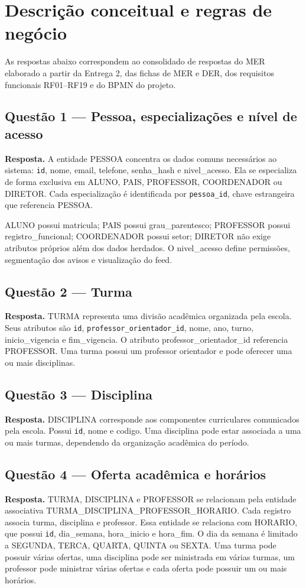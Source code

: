\section{Descrição conceitual e regras de negócio}
\begin{notebox}
As respostas abaixo correspondem ao consolidado de respostas do MER elaborado a partir da
Entrega 2, das fichas de MER e DER, dos requisitos funcionais RF01--RF19 e do BPMN do projeto.
\end{notebox}

\subsection{Questão 1 — Pessoa, especializações e nível de acesso}
\textbf{Resposta.} A entidade PESSOA concentra os dados comuns necessários ao sistema:
\texttt{id}, nome, email, telefone, senha\_hash e nivel\_acesso. Ela se especializa de forma exclusiva
em ALUNO, PAIS, PROFESSOR, COORDENADOR ou DIRETOR. Cada especialização é identificada por
\texttt{pessoa\_id}, chave estrangeira que referencia PESSOA.

ALUNO possui matricula; PAIS possui grau\_parentesco; PROFESSOR possui registro\_funcional;
COORDENADOR possui setor; DIRETOR não exige atributos próprios além dos dados herdados.
O nivel\_acesso define permissões, segmentação dos avisos e visualização do feed.

\subsection{Questão 2 — Turma}
\textbf{Resposta.} TURMA representa uma divisão acadêmica organizada pela escola. Seus atributos são
\texttt{id}, \texttt{professor\_orientador\_id}, nome, ano, turno, inicio\_vigencia e fim\_vigencia.
O atributo professor\_orientador\_id referencia PROFESSOR. Uma turma possui um professor orientador
e pode oferecer uma ou mais disciplinas.

\subsection{Questão 3 — Disciplina}
\textbf{Resposta.} DISCIPLINA corresponde aos componentes curriculares comunicados pela escola.
Possui \texttt{id}, nome e codigo. Uma disciplina pode estar associada a uma ou mais turmas,
dependendo da organização acadêmica do período.

\subsection{Questão 4 — Oferta acadêmica e horários}
\textbf{Resposta.} TURMA, DISCIPLINA e PROFESSOR se relacionam pela entidade associativa
TURMA\_DISCIPLINA\_PROFESSOR\_HORARIO. Cada registro associa turma, disciplina e professor.
Essa entidade se relaciona com HORARIO, que possui \texttt{id}, dia\_semana, hora\_inicio e
hora\_fim. O dia da semana é limitado a SEGUNDA, TERCA, QUARTA, QUINTA ou SEXTA.
Uma turma pode possuir várias ofertas, uma disciplina pode ser ministrada em várias turmas,
um professor pode ministrar várias ofertas e cada oferta pode possuir um ou mais horários.

